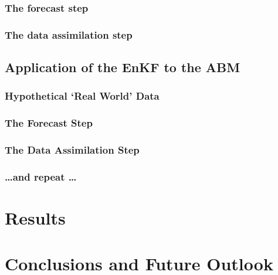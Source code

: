 \subsubsection{The forecast step}
\label{methods:enkf:forecast}

\subsubsection{The data assimilation step}
\label{methods:enkf:assimilation}

\subsection{Application of the EnKF to the ABM}
\label{malleson:methods:application}

\subsubsection{Hypothetical `Real World' Data}
\label{methods:application:data}

\subsubsection{The Forecast Step}
\label{methods:application:forecast}

\subsubsection{The Data Assimilation Step}
\label{methods:applicaiton:assimilation}

\subsubsection{\ldots and repeat \ldots}
\label{methods:application:repeat}

\section{Results}
\label{malleson:results}

\section{Conclusions and Future Outlook}
\label{malleson:conclusion}

